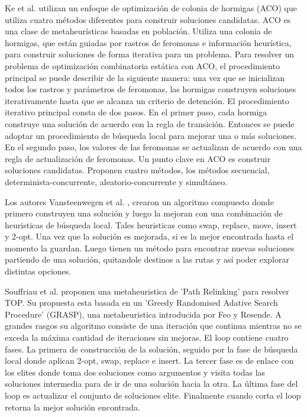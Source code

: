 \bigskip

Ke et al. \cite{KeArchettiFeng} utilizan un enfoque de optimización de colonia de hormigas (ACO) que utiliza cuatro métodos diferentes para construir soluciones candidatas. ACO es una clase de metaheurísticas basadas en población. Utiliza una colonia de hormigas, que están guiadas por rastros de feromonas e información heurística, para construir soluciones de forma iterativa para un problema. Para resolver un problema de optimización combinatoria estática con ACO, el procedimiento principal se puede describir de la siguiente manera: una vez que se inicializan todos los rastros y parámetros de feromonas, las hormigas construyen soluciones iterativamente hasta que se alcanza un criterio de detención. El procedimiento iterativo principal consta de dos pasos. En el primer paso, cada hormiga construye una solución de acuerdo con la regla de transición. Entonces se puede adoptar un procedimiento de búsqueda local para mejorar una o más soluciones. En el segundo paso, los valores de las feromonas se actualizan de acuerdo con una regla de actualización de feromonas. Un punto clave en ACO es construir soluciones candidatas. Proponen cuatro métodos, los métodos secuencial, determinista-concurrente, aleatorio-concurrente y simultáneo.

\bigskip

Los autores Vansteenwegen et al. \cite{VansteenwegenSouffriauBergheOudheusden}, crearon un algoritmo compuesto donde primero construyen una solución y luego la mejoran con una combinación de heuristicas de búsqueda local. Tales heuristicas como swap, replace, move, insert y 2-opt. Una vez que la solución es mejorada, si es la mejor encontrada hasta el momento la guardan. Luego tienen un método para encontrar nuevas soluciones partiendo de una solución, quitandole destinos a las rutas y así poder explorar distintas opciones.

\bigskip

Souffriau et al. \cite{SouffriauVansteenwegenBergheOudheusden} proponen una metaheuristica de 'Path Relinking' para resolver TOP. Su propuesta esta basada en un 'Greedy Randomised Adative Search Procedure' (GRASP), una metaheuristica introducida por Feo y Resende. A grandes rasgos su algoritmo consiste de una iteración que continua mientras no se exceda la máxima cantidad de iteraciones sin mejoras. El loop contiene cuatro fases. La primera de construcción de la solución, seguido por la fase de búsqueda local donde aplican 2-opt, swap, replace e insert. La tercer fase es de enlace con los elites donde toma dos soluciones como argumentos y visita todas las soluciones intermedia para de ir de una solución hacia la otra. La última fase del loop es actualizar el conjunto de soluciones elite. Finalmente cuando corta el loop retorna la mejor solución encontrada.

